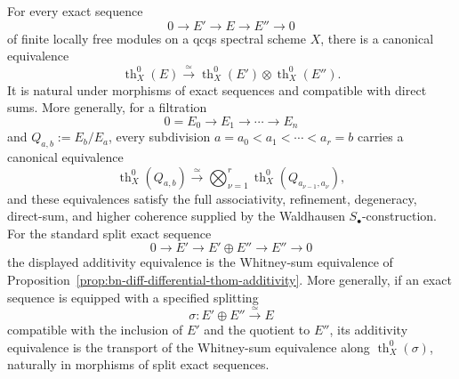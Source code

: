 \begin{proposition}
\label{prop:bn-diff-exact-thom-additivity}
For every exact sequence
\[
  0\longrightarrow E'
  \longrightarrow E
  \longrightarrow E''
  \longrightarrow0
\]
of finite locally free modules on a qcqs spectral scheme \(X\), there is a
canonical equivalence
\[
  \boxed{
  \operatorname{th}^0_X(E)
  \xrightarrow{\simeq}
  \operatorname{th}^0_X(E')\otimes
  \operatorname{th}^0_X(E'').
  }
\]
It is natural under morphisms of exact sequences and compatible with direct
sums.  More generally, for a filtration
\[
  0=E_0\longrightarrow E_1\longrightarrow\cdots\longrightarrow E_n
\]
and \(Q_{a,b}:=E_b/E_a\), every subdivision
\(a=a_0<a_1<\cdots<a_r=b\) carries a canonical equivalence
\[
  \boxed{
  \operatorname{th}^0_X(Q_{a,b})
  \xrightarrow{\simeq}
  \bigotimes_{\nu=1}^{r}
  \operatorname{th}^0_X(Q_{a_{\nu-1},a_\nu}),
  }
\]
and these equivalences satisfy the full associativity, refinement,
degeneracy, direct-sum, and higher coherence supplied by the Waldhausen
\(S_\bullet\)-construction.  For the standard split exact sequence
\[
    0\longrightarrow E'
    \longrightarrow E'\oplus E''
    \longrightarrow E''
    \longrightarrow0
\]
the displayed additivity equivalence is the Whitney-sum equivalence of
Proposition~\ref{prop:bn-diff-differential-thom-additivity}.  More generally,
if an exact sequence is equipped with a specified splitting
\[
    \sigma:E'\oplus E''\xrightarrow{\simeq}E
\]
compatible with the inclusion of $E'$ and the quotient to $E''$, its
additivity equivalence is the transport of the Whitney-sum equivalence
along $\operatorname{th}^0_X(\sigma)$, naturally in morphisms of split exact
sequences.
\end{proposition}

